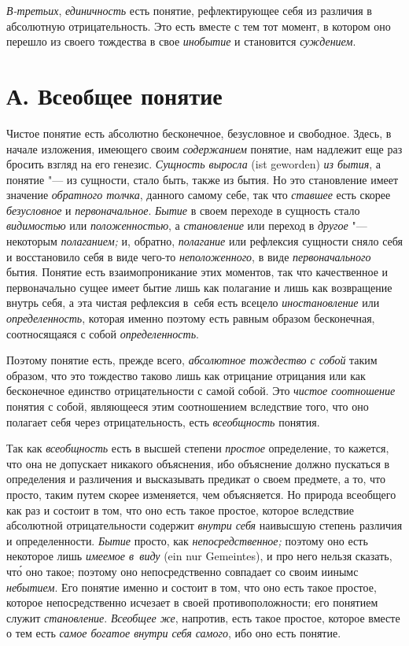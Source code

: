 {\em В-третьих}, {\em единичность} есть
понятие, рефлектирующее себя из различия в абсолютную отрицательность. Это
есть вместе с тем тот момент, в котором оно перешло из своего тождества в
свое {\em инобытие} и становится {\em суждением}.

\section[А. Всеобщее понятие]{А. Всеобщее понятие}

Чистое понятие есть абсолютно бесконечное, безусловное и свободное. Здесь,
в начале изложения, имеющего своим {\em содержанием} понятие, нам надлежит
еще раз бросить взгляд на его генезис. {\em Сущность выросла} (ist geworden)
{\em из бытия}, а понятие "--- из сущности, стало быть, также из бытия.
Но это становление имеет значение {\em обратного толчка}, данного самому себе,
так что {\em ставшее} есть скорее {\em безусловное} и {\em первоначальное}.
{\em Бытие} в своем переходе в сущность стало {\em видимостью} или
{\em положенностью}, а {\em становление} или переход
в {\em другое} "--- некоторым {\em полаганием;} и, обратно, {\em полагание}
или рефлексия сущности сняло себя и восстановило себя в виде чего-то
{\em неположенного}, в виде {\em первоначального} бытия. Понятие есть
взаимопроникание этих моментов, так что качественное и первоначально сущее
имеет бытие лишь как полагание и лишь как возвращение внутрь себя, а эта
чистая рефлексия в~себя есть всецело {\em иностановление} или
{\em определенность}, которая именно поэтому есть равным образом
бесконечная, соотносящаяся с собой {\em определенность}.

Поэтому понятие есть, прежде всего, {\em абсолютное тождество с собой}
таким образом, что это тождество таково лишь как отрицание
отрицания или как бесконечное единство отрицательности с самой собой. Это
{\em чистое соотношение} понятия с собой, являющееся этим соотношением
вследствие того, что оно полагает себя через отрицательность, есть
{\em всеобщность} понятия.

Так как {\em всеобщность} есть в высшей степени {\em простое}
определение, то кажется, что она не допускает никакого
объяснения, ибо объяснение должно пускаться в определения и различения и
высказывать предикат о своем предмете, а то, что просто,
таким путем скорее изменяется, чем объясняется. Но природа
всеобщего как раз и состоит в том, что оно есть такое простое, которое
вследствие абсолютной отрицательности содержит {\em внутри себя}
наивысшую степень различия и определенности. {\em Бытие} просто, как
{\em непосредственное;} поэтому оно есть некоторое лишь {\em имеемое в~виду}
(ein nur Gemeintes), и про него нельзя сказать, чт\'{о} оно такое; поэтому
оно непосредственно совпадает со своим иинымс
{\em небытием}.
Его понятие именно и состоит в том, что оно есть такое
простое, которое непосредственно исчезает в своей
противоположности; его понятием служит {\em становление}. {\em Всеобщее же},
напротив, есть такое простое, которое вместе о тем есть
{\em самое богатое внутри себя самого}, ибо оно есть понятие.

